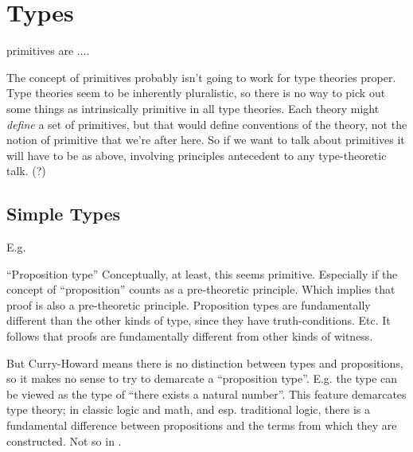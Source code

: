 \section{\HoTT{} Types}
\label{subs:hott}

\HoTT{} primitives are ....

\begin{ednote}
  The concept of primitives probably isn't going to work for type
  theories proper.  Type theories seem to be inherently pluralistic,
  so there is no way to pick out some things as intrinsically
  primitive in all type theories.  Each theory might \emph{define} a
  set of primitives, but that would define conventions of the theory,
  not the notion of primitive that we're after here.  So if we want to
  talk about primitives it will have to be as above, involving
  principles antecedent to any type-theoretic talk. (?)
\end{ednote}

\subsection{Simple Types}
\label{subs:simpletypes}

\begin{ednote}
  E.g. \N
\end{ednote}

``Proposition type'' Conceptually, at least, this seems primitive.
Especially if the concept of ``proposition'' counts as a pre-theoretic
principle.  Which implies that proof is also a pre-theoretic
principle.  Proposition types are fundamentally different than the
other kinds of type, since they have
truth-conditions. Etc.  It follows that proofs are
fundamentally different from other kinds of witness.

\begin{ednote}
  But Curry-Howard means there is no distinction between types and
  propositions, so it makes no sense to try to demarcate a
  ``proposition type''.  E.g. the type \N can be viewed as the type of
  ``there exists a natural number''.  This feature demarcates type
  theory; in classic logic and math, and esp. traditional logic, there
  is a fundamental difference between propositions and the terms from
  which they are constructed.  Not so in \tth{}.
\end{ednote}


